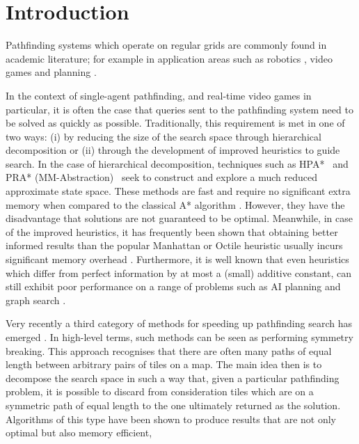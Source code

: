 \section{Introduction}
Pathfinding systems which operate on regular grids are commonly found in
academic literature; for example in application areas such as robotics 
\cite{choset05}, video games \cite{botea04,bjornsson06,sturtevant07} and 
planning \cite{DBLP:conf/aips/HernandezMSK09,DBLP:conf/aips/ThayerR09,DBLP:conf/aips/WangB08,DBLP:conf/aips/ThayerR08,DBLP:conf/aips/BulitkoBLSS07}.
\par
In the context of single-agent pathfinding, and real-time video games in particular, 
it is often the case that queries sent to the pathfinding system  need to be solved as quickly as possible.
Traditionally, this requirement is met in one of two ways: (i) by reducing the size of the search space through hierarchical 
decomposition or (ii) through the development of improved heuristics to guide search.
In the case of hierarchical decomposition, techniques such as
HPA*~\cite{botea04} and PRA* (MM-Abstraction)~\cite{sturtevant07} seek to construct and explore
a much reduced approximate state space.
These methods are fast and require no significant extra memory when compared to the classical
A* algorithm \cite{hart68}.
However, they have the disadvantage that solutions are not guaranteed to be optimal.
Meanwhile, in case of the improved heuristics, it has frequently been shown
that obtaining better informed results than the popular
Manhattan or Octile heuristic usually incurs significant memory overhead 
\cite{sturtevant09,goldberg05,Cazenave:06,bjornsson06}.
Furthermore, it is well known that even heuristics which differ from perfect information 
by at most a (small) additive constant, can still exhibit poor performance on a range of 
problems such as AI planning and graph search \cite{helmert08,pohl77}.
\par
Very recently a third category of methods for speeding up pathfinding search has emerged
\cite{bjornsson06,pochter10,harabor10}.
In high-level terms, such methods can be seen as performing symmetry breaking.
This approach recognises that there are often many paths of equal length between arbitrary pairs of tiles on a map.
The main idea then is to decompose the search space in such a way that, given a particular pathfinding problem, it is possible to
discard from consideration tiles which are on a symmetric path of equal length to the one ultimately returned 
as the solution.
Algorithms of this type have been  shown to produce results that are not only optimal but also memory efficient, 
